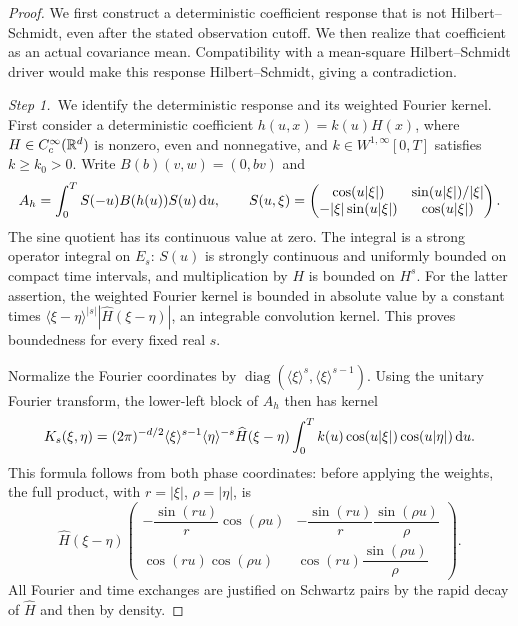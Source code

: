 \begin{proof}
  We first construct a deterministic coefficient response that is not
  Hilbert--Schmidt, even after the stated observation cutoff. We then realize
  that coefficient as an actual covariance mean. Compatibility with a
  mean-square Hilbert--Schmidt driver would make this response
  Hilbert--Schmidt, giving a contradiction.


  \medskip
  \noindent\textit{Step 1.~}We identify the deterministic response and its
  weighted Fourier kernel.
  First consider a deterministic coefficient $h(u,x)=k(u)H(x)$, where
  $H\in C_c^\infty(\mathbb{R}^d)$ is nonzero, even and nonnegative, and
  $k\in W^{1,\infty}[0,T]$ satisfies $k\ge k_0>0$. Write
  $B(b)(v,w)=(0,bv)$ and
  \[
    A_h=\int_0^T S(-u)B(h(u))S(u)\,\mathrm{d} u,\qquad
    S(u,\xi)=\begin{pmatrix}
      \cos(u|\xi|)&\sin(u|\xi|)/|\xi|\\
      -|\xi|\sin(u|\xi|)&\cos(u|\xi|)
    \end{pmatrix}.
  \]
  The sine quotient has its continuous value at zero. The integral is a strong
  operator integral on $E_s$: $S(u)$ is strongly continuous and uniformly
  bounded on compact time intervals, and multiplication by $H$ is bounded on
  $H^s$. For the latter assertion, the weighted Fourier kernel is bounded in
  absolute value by a constant times
  $\langle\xi-\eta\rangle^{|s|}|\widehat H(\xi-\eta)|$, an integrable
  convolution kernel. This proves boundedness for every fixed real $s$.

  Normalize the Fourier coordinates by
  $\operatorname{diag}(\langle\xi\rangle^s,\langle\xi\rangle^{s-1})$.
  Using the unitary Fourier transform, the lower-left block of $A_h$ then has
  kernel
  \[
    K_s(\xi,\eta)=(2\pi)^{-d/2}
    \langle\xi\rangle^{s-1}\langle\eta\rangle^{-s}
    \widehat H(\xi-\eta)
    \int_0^T k(u)\cos(u|\xi|)\cos(u|\eta|)\,\mathrm{d} u.
  \]
  This formula follows from both phase coordinates: before applying the weights,
  the full product, with $r=|\xi|$, $\rho=|\eta|$, is
  \[
    \widehat H(\xi-\eta)
    \begin{pmatrix}
      -\dfrac{\sin(ru)}r\cos(\rho u)&
      -\dfrac{\sin(ru)}r\dfrac{\sin(\rho u)}\rho\\
      \cos(ru)\cos(\rho u)&\cos(ru)\dfrac{\sin(\rho u)}\rho
    \end{pmatrix}.
  \]
  All Fourier and time exchanges are justified on Schwartz pairs by the rapid
  decay of $\widehat H$ and then by density.



\end{proof}
